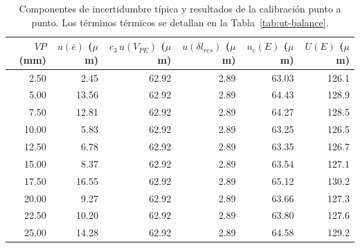 \begin{table}[H]
\centering
\caption{Componentes de incertidumbre típica y resultados de la calibración punto a punto. Los términos térmicos se detallan en la Tabla~\ref{tab:ut-balance}.}
\label{tab:ut-componentes}
\begin{tabular}{rrrrrr}
\toprule
$VP$ (mm) & $u(\bar e)$ ($\mu$m) & $c_3\,u(V_{PE})$ ($\mu$m) & $u(\delta l_{res})$ ($\mu$m) & $u_c(E)$ ($\mu$m) & $U(E)$ ($\mu$m) \\
\midrule
2.50 & 2.45 & 62.92 & 2.89 & 63.03 & 126.1 \\
5.00 & 13.56 & 62.92 & 2.89 & 64.43 & 128.9 \\
7.50 & 12.81 & 62.92 & 2.89 & 64.27 & 128.5 \\
10.00 & 5.83 & 62.92 & 2.89 & 63.25 & 126.5 \\
12.50 & 6.78 & 62.92 & 2.89 & 63.35 & 126.7 \\
15.00 & 8.37 & 62.92 & 2.89 & 63.54 & 127.1 \\
17.50 & 16.55 & 62.92 & 2.89 & 65.12 & 130.2 \\
20.00 & 9.27 & 62.92 & 2.89 & 63.66 & 127.3 \\
22.50 & 10.20 & 62.92 & 2.89 & 63.80 & 127.6 \\
25.00 & 14.28 & 62.92 & 2.89 & 64.58 & 129.2 \\
\bottomrule
\end{tabular}
\end{table}
